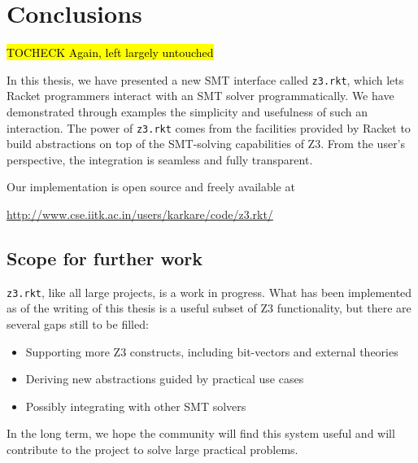 \chapter{Conclusions}

\hl{TOCHECK Again, left largely untouched}

In this thesis, we have presented a new SMT interface called \texttt{z3.rkt},
which lets Racket programmers interact with an SMT solver programmatically. We
have demonstrated through examples the simplicity and usefulness of such an
interaction. The power of \texttt{z3.rkt} comes from the facilities provided
by Racket to build abstractions on top of the SMT-solving capabilities of Z3.
From the user's perspective, the integration is seamless and fully
transparent.

Our implementation is open source and freely available at
\begin{center}
\url{http://www.cse.iitk.ac.in/users/karkare/code/z3.rkt/}
\end{center}

\section{Scope for further work}

\texttt{z3.rkt}, like all large projects, is a work in progress. What has been
implemented as of the writing of this thesis is a useful subset of Z3
functionality, but there are several gaps still to be filled:

\begin{itemize}
\item Supporting more Z3 constructs, including bit-vectors and external theories
\item Deriving new abstractions guided by practical use cases
\item Possibly integrating with other SMT solvers
\end{itemize}

In the long term, we hope the community will find this system useful and will
contribute to the project to solve large practical problems.
